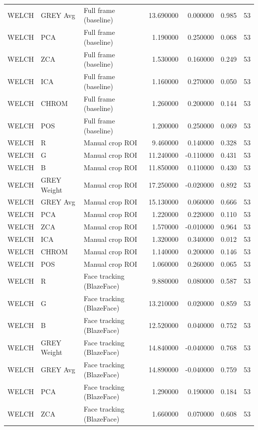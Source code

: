 \begin{table}[htbp]
\begin{tabular}{l l l r r l r}
WELCH & GREY Avg & Full frame (baseline) & 13.690000 & 0.000000 & 0.985 & 53 \\
WELCH & PCA & Full frame (baseline) & 1.190000 & 0.250000 & 0.068 & 53 \\
WELCH & ZCA & Full frame (baseline) & 1.530000 & 0.160000 & 0.249 & 53 \\
WELCH & ICA & Full frame (baseline) & 1.160000 & 0.270000 & 0.050 & 53 \\
WELCH & CHROM & Full frame (baseline) & 1.260000 & 0.200000 & 0.144 & 53 \\
WELCH & POS & Full frame (baseline) & 1.200000 & 0.250000 & 0.069 & 53 \\
WELCH & R & Manual crop ROI & 9.460000 & 0.140000 & 0.328 & 53 \\
WELCH & G & Manual crop ROI & 11.240000 & -0.110000 & 0.431 & 53 \\
WELCH & B & Manual crop ROI & 11.850000 & 0.110000 & 0.430 & 53 \\
WELCH & GREY Weight & Manual crop ROI & 17.250000 & -0.020000 & 0.892 & 53 \\
WELCH & GREY Avg & Manual crop ROI & 15.130000 & 0.060000 & 0.666 & 53 \\
WELCH & PCA & Manual crop ROI & 1.220000 & 0.220000 & 0.110 & 53 \\
WELCH & ZCA & Manual crop ROI & 1.570000 & -0.010000 & 0.964 & 53 \\
WELCH & ICA & Manual crop ROI & 1.320000 & 0.340000 & 0.012 & 53 \\
WELCH & CHROM & Manual crop ROI & 1.140000 & 0.200000 & 0.146 & 53 \\
WELCH & POS & Manual crop ROI & 1.060000 & 0.260000 & 0.065 & 53 \\
WELCH & R & Face tracking (BlazeFace) & 9.880000 & 0.080000 & 0.587 & 53 \\
WELCH & G & Face tracking (BlazeFace) & 13.210000 & 0.020000 & 0.859 & 53 \\
WELCH & B & Face tracking (BlazeFace) & 12.520000 & 0.040000 & 0.752 & 53 \\
WELCH & GREY Weight & Face tracking (BlazeFace) & 14.840000 & -0.040000 & 0.768 & 53 \\
WELCH & GREY Avg & Face tracking (BlazeFace) & 14.890000 & -0.040000 & 0.759 & 53 \\
WELCH & PCA & Face tracking (BlazeFace) & 1.290000 & 0.190000 & 0.184 & 53 \\
WELCH & ZCA & Face tracking (BlazeFace) & 1.660000 & 0.070000 & 0.608 & 53 \\

\end{tabular}
\end{table}
